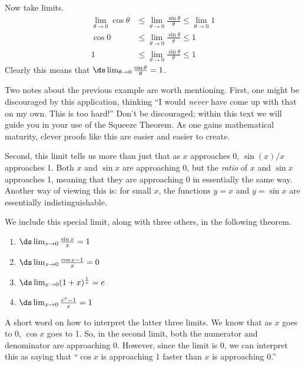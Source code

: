 \begin{example}
Now take limits.\vspace{-.3\baselineskip}
\begin{align*}
\lim_{\theta\to 0} \cos \theta &\leq \lim_{\theta\to 0} \frac{\sin\theta}{\theta} \leq \lim_{\theta\to 0}  1 \\
\cos 0 & \leq \lim_{\theta\to 0} \frac{\sin\theta}{\theta} \leq  1 \\
1 & \leq \lim_{\theta\to 0} \frac{\sin\theta}{\theta} \leq  1
\end{align*}
Clearly this means that $\ds \lim_{\theta\to 0} \frac{\sin\theta}{\theta}=1$.
\end{example}

Two notes about the previous example are worth mentioning. First, one might be discouraged by this application, thinking ``I would \emph{never} have come up with that on my own. This is too hard!'' Don't be discouraged; within this text we will guide you in your use of the Squeeze Theorem. As one gains mathematical maturity, clever proofs like this are easier and easier to create.

Second, this limit tells us more than just that as $x$ approaches 0, $\sin(x)/x$ approaches 1. Both $x$ and $\sin x$ are approaching 0, but the \emph{ratio} of $x$ and $\sin x$ approaches 1, meaning that they are approaching 0 in essentially the same way. Another way of viewing this is: for small $x$, the functions $y=x$ and $y=\sin x$ are essentially indistinguishable.\bigskip

We include this special limit, along with three others, in the following theorem.

\begin{theorem}\label{thm:special_limits}
\mbox{}\vspace{-1.5\baselineskip}
\begin{multicols}{2}
\begin{enumerate}
	\item		$\ds \lim_{x\to 0} \frac{\sin x}{x} = 1$
	\item		$\ds \lim_{x\to 0} \frac{\cos x-1}{x} = 0$
	\item		$\ds \lim_{x\to 0} (1+x)^\frac1x = e$
	\item		$\ds \lim_{x\to 0} \frac{e^x-1}{x} = 1$
\end{enumerate}
\end{multicols}
\end{theorem}

A short word on how to interpret the latter three limits. We know that as $x$ goes to 0, $\cos x$ goes to 1. So, in the second limit, both the numerator and denominator are approaching 0. However, since the limit is 0, we can interpret this as saying that ``$\cos x$ is approaching 1 faster than $x$ is approaching 0.''

